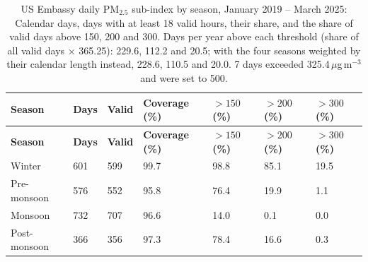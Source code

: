 \begingroup\footnotesize
\begin{longtable}{L{2.6cm} C{1.6cm} C{1.4cm} C{1.6cm} C{1.6cm} C{1.6cm} C{1.6cm}}
\caption{US Embassy daily PM$_{2.5}$ sub-index by season, January 2019 -- March 2025: Calendar days, days with at least 18 valid hours, their share, and the share of valid days above 150, 200 and 300. Days per year above each threshold (share of all valid days $\times$ 365.25): 229.6, 112.2 and 20.5; with the four seasons weighted by their calendar length instead, 228.6, 110.5 and 20.0. 7 days exceeded 325.4\,$\mu$g\,m$^{-3}$ and were set to 500.}\label{tab:s-aqi-annual}\\
\toprule
\textbf{Season} & \textbf{Days} & \textbf{Valid} & \textbf{Coverage (\%)} & \textbf{$>150$ (\%)} & \textbf{$>200$ (\%)} & \textbf{$>300$ (\%)} \\
\midrule\endfirsthead
\toprule
\textbf{Season} & \textbf{Days} & \textbf{Valid} & \textbf{Coverage (\%)} & \textbf{$>150$ (\%)} & \textbf{$>200$ (\%)} & \textbf{$>300$ (\%)} \\
\midrule\endhead
\bottomrule\endfoot
Winter & 601 & 599 & 99.7 & 98.8 & 85.1 & 19.5 \\
Pre-monsoon & 576 & 552 & 95.8 & 76.4 & 19.9 & 1.1 \\
Monsoon & 732 & 707 & 96.6 & 14.0 & 0.1 & 0.0 \\
Post-monsoon & 366 & 356 & 97.3 & 78.4 & 16.6 & 0.3 \\
\end{longtable}
\endgroup
